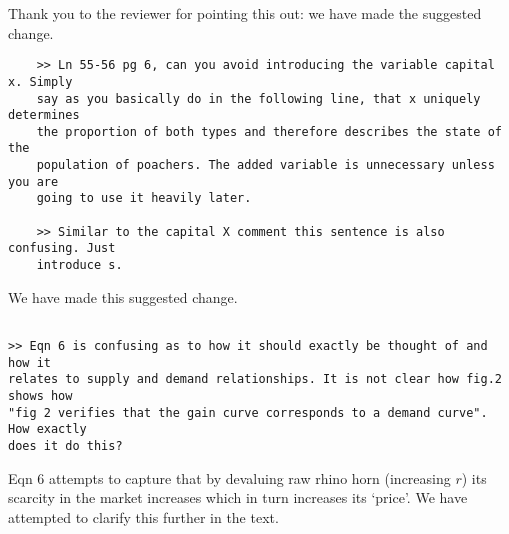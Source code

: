 \documentclass[10pt]{article}
\begin{document}
Thank you to the reviewer for pointing this out: we have made the suggested
change.

\begin{verbatim}
    >> Ln 55-56 pg 6, can you avoid introducing the variable capital x. Simply
    say as you basically do in the following line, that x uniquely determines
    the proportion of both types and therefore describes the state of the
    population of poachers. The added variable is unnecessary unless you are
    going to use it heavily later.

    >> Similar to the capital X comment this sentence is also confusing. Just
    introduce s.

\end{verbatim}

We have made this suggested change.

\begin{verbatim}

>> Eqn 6 is confusing as to how it should exactly be thought of and how it
relates to supply and demand relationships. It is not clear how fig.2 shows how
"fig 2 verifies that the gain curve corresponds to a demand curve". How exactly
does it do this?
\end{verbatim}

Eqn 6 attempts to capture that by devaluing raw rhino horn (increasing \(r\))
its scarcity in the market increases which in turn increases its `price'.
We have attempted to clarify this further in the text.
\end{document}
